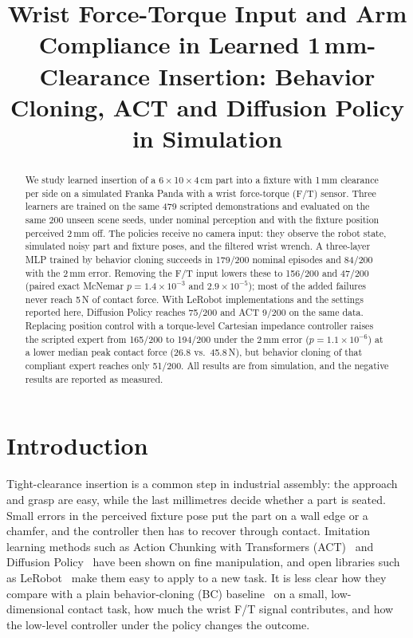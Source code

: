 \documentclass[conference]{IEEEtran}
\title{Wrist Force-Torque Input and Arm Compliance in Learned 1\,mm-Clearance Insertion: Behavior Cloning, ACT and Diffusion Policy in Simulation}
\author{\IEEEauthorblockN{Pavan Yadav Annappa}
\IEEEauthorblockA{Friedrich-Alexander-Universit\"at Erlangen-N\"urnberg, Germany\\
(M.Sc. student; independent work)\\
pavanyadava07@gmail.com}}
\begin{document}
\maketitle

\begin{abstract}
We study learned insertion of a 6\,$\times$\,10\,$\times$\,4\,cm part into a fixture with 1\,mm clearance per side on a simulated Franka Panda with a wrist force-torque (F/T) sensor. Three learners are trained on the same 479 scripted demonstrations and evaluated on the same 200 unseen scene seeds, under nominal perception and with the fixture position perceived 2\,mm off. The policies receive no camera input: they observe the robot state, simulated noisy part and fixture poses, and the filtered wrist wrench. A three-layer MLP trained by behavior cloning succeeds in 179/200 nominal episodes and 84/200 with the 2\,mm error. Removing the F/T input lowers these to 156/200 and 47/200 (paired exact McNemar $p = 1.4\times10^{-3}$ and $2.9\times10^{-5}$); most of the added failures never reach 5\,N of contact force. With LeRobot implementations and the settings reported here, Diffusion Policy reaches 75/200 and ACT 9/200 on the same data. Replacing position control with a torque-level Cartesian impedance controller raises the scripted expert from 165/200 to 194/200 under the 2\,mm error ($p = 1.1\times10^{-6}$) at a lower median peak contact force (26.8 vs.\ 45.8\,N), but behavior cloning of that compliant expert reaches only 51/200. All results are from simulation, and the negative results are reported as measured.
\end{abstract}

\section{Introduction}
Tight-clearance insertion is a common step in industrial assembly: the approach and grasp are easy, while the last millimetres decide whether a part is seated. Small errors in the perceived fixture pose put the part on a wall edge or a chamfer, and the controller then has to recover through contact. Imitation learning methods such as Action Chunking with Transformers (ACT)~\cite{zhao2023act} and Diffusion Policy~\cite{chi2023diffusion} have been shown on fine manipulation, and open libraries such as LeRobot~\cite{cadene2024lerobot} make them easy to apply to a new task. It is less clear how they compare with a plain behavior-cloning (BC) baseline~\cite{pomerleau1988alvinn} on a small, low-dimensional contact task, how much the wrist F/T signal contributes, and how the low-level controller under the policy changes the outcome.
\end{document}

